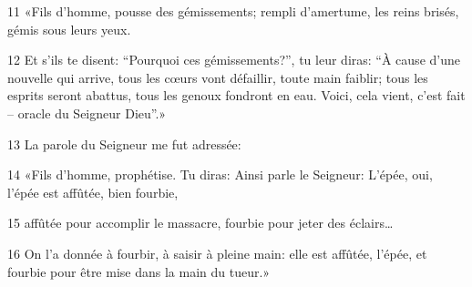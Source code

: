 11 «Fils d’homme, pousse des gémissements; rempli d’amertume, les reins brisés, gémis sous leurs yeux.

12 Et s’ils te disent: “Pourquoi ces gémissements?”, tu leur diras: “À cause d’une nouvelle qui arrive, tous les cœurs vont défaillir, toute main faiblir; tous les esprits seront abattus, tous les genoux fondront en eau. Voici, cela vient, c’est fait – oracle du Seigneur Dieu”.»

13 La parole du Seigneur me fut adressée:

14 «Fils d’homme, prophétise. Tu diras: Ainsi parle le Seigneur: L’épée, oui, l’épée est affûtée, bien fourbie,

15 affûtée pour accomplir le massacre, fourbie pour jeter des éclairs…

16 On l’a donnée à fourbir, à saisir à pleine main: elle est affûtée, l’épée, et fourbie pour être mise dans la main du tueur.»